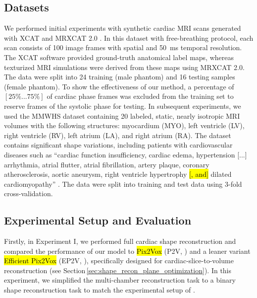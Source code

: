     \subsection{Datasets}
     We performed initial experiments with synthetic cardiac MRI scans generated with XCAT \cite{segars20104d} and MRXCAT 2.0 \cite{buoso2023mrxcat2}.
    In this dataset with free-breathing protocol, each scan consists of 100 image frames with  spatial and \SI{50}{\milli\second} temporal resolution.
    The XCAT software provided ground-truth anatomical label maps, whereas texturized MRI simulations were derived from these maps using MRXCAT 2.0.
    The data were split into 24 training (male phantom) and 16 testing samples (female phantom). To show the effectiveness of our method,
    a percentage of $\left[25\% ... 75\%\right]$ of cardiac phase frames was excluded from the training set to reserve frames of the systolic phase for testing.
    In subsequent experiments, we used the MMWHS dataset \cite{zhuang2016multi} containing 20 labeled, static, nearly isotropic MRI volumes with the following structures: myocardium (MYO), left ventricle (LV), right ventricle (RV), left atrium (LA), and right atrium (RA). The dataset contains significant shape variations, including patients with cardiovascular diseases such as ``cardiac function insufficiency, cardiac edema, hypertension [...] arrhythmia, atrial flutter, atrial fibrillation, artery plaque, coronary atherosclerosis, aortic aneurysm, right ventricle hypertrophy \hl{[, and]} %
 dilated cardiomyopathy'' \cite{zhuang2016multi}.
    The data were split into training and test data using 3-fold cross-validation.

    \subsection{Experimental Setup and Evaluation}
    \label{sec:experiments}
     Firstly, in Experiment I, we performed full cardiac shape reconstruction and compared the performance of our model to \hl{Pix2Vox} (P2V, \cite{xie2019pix2vox}) and a leaner variant \hl{Efficient Pix2Vox} %
 (EP2V, \cite{stojanovski2022efficient}), specifically designed for cardiac-slice-to-volume reconstruction (see Section\,\ref{sec:shape_recon_plane_optimization}).
    In this experiment, we simplified the multi-chamber reconstruction task to a binary shape reconstruction task to match the experimental setup of \cite{stojanovski2022efficient}.

